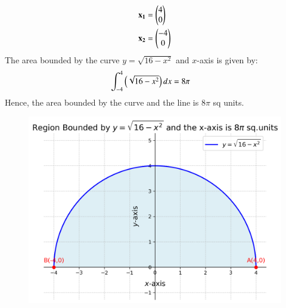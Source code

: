 \documentclass[journal,12pt,onecolumn]{IEEEtran}
\theoremstyle{remark}
\begin{document}
\begin{align}
	\mathbf{x_1} &= \begin{pmatrix}4 \\0\end{pmatrix}\\
	\mathbf{x_2} &= \begin{pmatrix}-4\\0\end{pmatrix}
\end{align}
The area bounded by the curve $y =\sqrt{ 16-x^2}$ and $x$-axis is given by:
\begin{align}
	\int_{-4}^{4}\left(\sqrt{16-x^2} \right)dx &= 8\pi 
\end{align}
Hence, the area bounded by the curve and the line is $8\pi$ sq units.\\
\begin{figure}[h]
	\centering
	\includegraphics[scale=0.7]{figs/plot.png}
	\label{Fig}
\end{figure}
\end{document}
